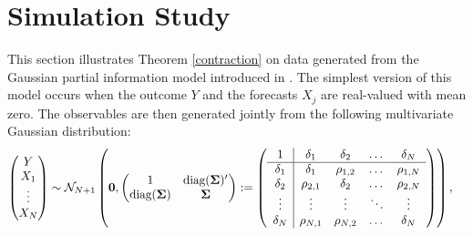 \documentclass[11pt]{article}
\theoremstyle{definition}
\theoremstyle{definition}
\def\bSigma{{\bf \Sigma}}
\def\diag{\text{diag}}
\def\diag{\text{diag}}
\begin{document}
\section{Simulation Study} \label{simulation}

This section illustrates Theorem \ref{contraction} on data generated from the Gaussian partial information model introduced in \cite{satopaamodeling2, satopaamodeling}. 
%
 The simplest version of this model occurs when the outcome $Y$ and the forecasts $X_j$ are real-valued with mean zero. The observables are then generated jointly from the following multivariate Gaussian distribution:
\begin{align}
\left(\begin{matrix} Y \\ X_{1}\\ \vdots \\ X_{N} \end{matrix}\right) &\sim \mathcal{N}_{N+1}\left( 
 \boldsymbol{0}, \left(\begin{matrix} 
1 & \diag(\bSigma)'\\
\diag(\bSigma) &\bSigma\\
 \end{matrix}\right) 
 :=
 \left(\begin{array}{c | c c cc }
1 & \delta_1 & \delta_2 & \dots & \delta_N  \\ \hline
\delta_1 & \delta_1 &\rho_{1,2} & \dots & \rho_{1,N}   \\ 
\delta_2 & \rho_{2,1} & \delta_2 & \dots & \rho_{2,N}  \\ 
\vdots & \vdots & \vdots & \ddots & \vdots  \\ 
\delta_N & \rho_{N,1} & \rho_{N,2} & \dots & \delta_N\\ 
 \end{array}\right)\right),  \label{NExperts}
\end{align}
\end{document}
